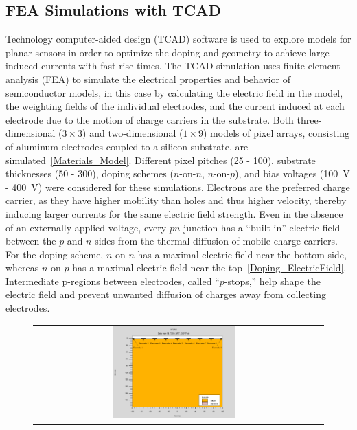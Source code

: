 \begin{refsection}
\section{FEA Simulations with TCAD}
Technology computer-aided design (TCAD) software is used to explore models for planar sensors in order to optimize the doping and geometry to achieve large induced currents with fast rise times.
The TCAD simulation uses finite element analysis (FEA) to simulate the electrical properties and behavior of semiconductor models, in this case by calculating the electric field in the model, the weighting fields of the individual electrodes, and the current induced at each electrode due to the motion of charge carriers in the substrate.
Both three-dimensional ($3 \times 3$) and two-dimensional ($1 \times 9$) models of pixel arrays, consisting of aluminum electrodes coupled to a silicon substrate, are simulated~\ref{Materials_Model}.
Different pixel pitches (\SI{25}{\micron} - \SI{100}{\micron}), substrate thicknesses (\SI{50}{\micron} - \SI{300}{\micron}), doping schemes ($n$-on-$n$, $n$-on-$p$), and bias voltages (\SI{100}{\V} - \SI{400}{\V}) were considered for these simulations.
Electrons are the preferred charge carrier, as they have higher mobility than holes and thus higher velocity, thereby inducing larger currents for the same electric field strength.
Even in the absence of an externally applied voltage, every $pn$-junction has a ``built-in'' electric field between the $p$ and $n$ sides from the thermal diffusion of mobile charge carriers.
For the doping scheme, $n$-on-$n$ has a maximal electric field near the bottom side, whereas $n$-on-$p$ has a maximal electric field near the top~\ref{Doping_ElectricField}.
Intermediate p-regions between electrodes, called ``$p$-stops,'' help shape the electric field and prevent unwanted diffusion of charges away from collecting electrodes.
\begin{figure}[htb]
  \begin{center}
    \begin{tabular}{cc}
      \includegraphics[width=0.45\textwidth]{fig_FastTiming/Materials.png}

\end{tabular}
\end{center}
\end{figure}
\end{refsection}

